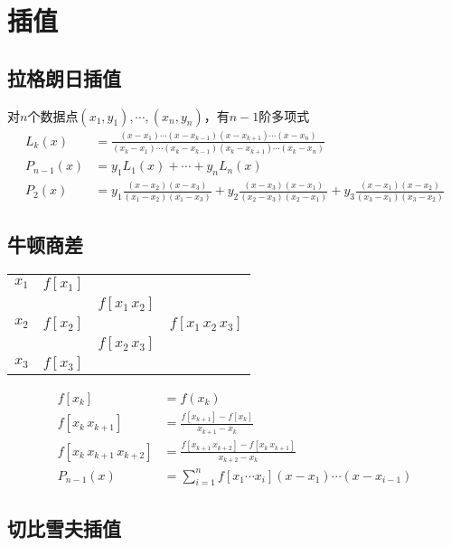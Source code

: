 \documentclass[twocolumn]{article}
\begin{document}
\section{插值}
\subsection{拉格朗日插值}
对$n$个数据点$(x_1,y_1),\cdots,(x_n,y_n)$，有$n-1$阶多项式
\footnotesize
\begin{align*}
    L_k(x)     & =\frac{(x-x_1)\cdots(x-x_{k-1})(x-x_{k+1})\cdots(x-x_n)}{(x_k-x_1)\cdots(x_k-x_{k-1})(x_k-x_{k+1})\cdots(x_k-x_n)}                      \\
    P_{n-1}(x) & =y_1L_1(x)+\cdots+y_nL_n(x)                                                                                                             \\
    P_2(x)     & =y_1\frac{(x-x_2)(x-x_3)}{(x_1-x_2)(x_1-x_3)}+y_2\frac{(x-x_3)(x-x_1)}{(x_2-x_3)(x_2-x_1)}+y_3\frac{(x-x_1)(x-x_2)}{(x_3-x_1)(x_3-x_2)}
\end{align*}
\small

\subsection{牛顿商差}
\begin{center}
    \begin{tabular}{c|ccc}
        $x_1$ & $f[x_1]$ &                 &                        \\
              &          & $f[x_1 \, x_2]$ &                        \\
        $x_2$ & $f[x_2]$ &                 & $f[x_1 \, x_2 \, x_3]$ \\
              &          & $f[x_2 \, x_3]$ &                        \\
        $x_3$ & $f[x_3]$ &                 &
    \end{tabular}
\end{center}
\begin{align*}
    f[x_k]                       & =f(x_k)                                                      \\
    f[x_k \, x_{k+1}]            & =\frac{f[x_{k+1}]-f[x_k]}{x_{k+1}-x_k}                       \\
    f[x_k \, x_{k+1} \, x_{k+2}] & =\frac{f[x_{k+1} \, x_{k+2}]-f[x_k \, x_{k+1}]}{x_{k+2}-x_k}\\
    P_{n-1}(x)&=\sum_{i=1}^n f[x_1\cdots x_i](x-x_1)\cdots(x-x_{i-1})
\end{align*}

\subsection{切比雪夫插值}
\end{document}
